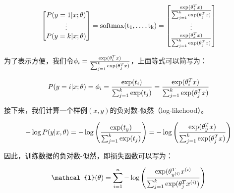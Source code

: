 \documentclass[letterpaper,11pt]{article}
\numberwithin{equation}{section}
\begin{document}
\begin{CJK}{UTF8}{gbsn}
  \begin{equation}
    \begin{bmatrix}
      P(y=1 | x;\theta) \\
      \vdots \\
      P(y=k | x;\theta) \\
    \end{bmatrix}
    =
    \rm{softmax}(t_1,\ldots,t_k)
    =
    \begin{bmatrix}
      \frac{{\rm{exp}} (\theta_1^T x)}{\sum^k_{j=1}{\rm{exp}} (\theta_j^T x)} \\
      \vdots \\
      \frac{{\rm{exp}} (\theta_k^T x)}{\sum^k_{j=1}{\rm{exp}} (\theta_j^T x)} \\
    \end{bmatrix}
  \end{equation}

  为了表示方便，我们令$\phi_i=\frac{{\rm{exp}} (\theta_i^T x)}{\sum^k_{j=1}{\rm{exp}} (\theta_j^T x)}$，上面等式可以简写为：

  \begin{equation}
    P(y=i|x;\theta) = \phi_i= \frac{{\rm{exp}} (t_i)}{\sum^k_{j=1}{\rm{exp}} (t_j)} = \frac{{\rm{exp}} (\theta_i^T x)}{\sum^k_{j=1}{\rm{exp}} (\theta_j^T x)}
  \end{equation}

  接下来，我们计算一个样例$(x,y)$的负对数-似然（log-likehood）。

  \begin{equation}
    -\log P(y|x,\theta)=-\log \left( \frac{{\rm{exp}} (t_y)}{\sum^k_{j=1}{\rm{exp}} (t_j)} \right) = -\log \left( \frac{{\rm{exp}} (\theta_y^T x)}{\sum^k_{j=1}{\rm{exp}} (\theta_j^T x)} \right)
  \end{equation}

  因此，训练数据的负对数-似然，即损失函数可以写为：

  \begin{equation}
    \mathcal{l}(\theta) = \sum^n_{i=1} - \log \left( \frac{{\rm{exp}} (\theta_{y^{(i)}}^T x^{(i)}}{\sum^k_{j=1}{\rm{exp}} (\theta_j^T x^{(i)})} \right)
  \end{equation}

\end{CJK}
\end{document}
